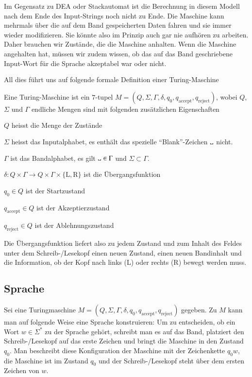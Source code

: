 Im Gegensatz zu DEA oder Stackautomat ist die Berechnung in diesem
Modell nach dem Ende des Input-Strings noch nicht zu Ende. Die Maschine
kann mehrmals über die auf dem Band gespeicherten Daten fahren und
sie immer wieder modifizieren. Sie könnte also im Prinzip auch
gar nie aufhören zu arbeiten. Daher brauchen wir Zustände, die
die Maschine anhalten. Wenn die Maschine angehalten hat, müssen wir
zudem wissen, ob das auf das Band geschriebene Input-Wort für die
Sprache akzeptabel war oder nicht.

All dies führt uns auf folgende formale Definition einer Turing-Maschine
\begin{definition}
%
Eine Turing-Maschine ist ein $7$-tupel
$M=(Q,\Sigma,\Gamma,\delta,q_0,q_{\text{accept}},q_{\text{reject}})$,
wobei $Q$, $\Sigma$ und $\Gamma$ endliche Mengen sind mit folgenden
zusätzlichen Eigenschaften
\begin{compactenum}
%
\item $Q$ heisst die Menge der Zustände
%
%
%
%
\item $\Sigma$ heisst das Inputalphabet, es enthält das spezielle
``Blank''-Zeichen $\blank$ nicht.
%
\item $\Gamma$ ist das Bandalphabet, es gilt $\blank\in\Gamma$ und
$\Sigma\subset\Gamma$.
%
\item $\delta\colon Q\times \Gamma\to Q\times\Gamma\times\{\text{L},\text{R}\}$
ist die Übergangsfunktion
%
\item $q_0\in Q$ ist der Startzustand
%
\item $q_{\text{accept}}\in Q$ ist der Akzeptierzustand
%
\item $q_{\text{reject}}\in Q$ ist der Ablehnungszustand
\end{compactenum}
\end{definition}
Die Übergangsfunktion liefert also zu jedem Zustand und zum
Inhalt des Feldes unter dem Schreib-/Lesekopf einen neuen
Zustand, einen neuen Bandinhalt und die Information, ob
der Kopf nach links (L) oder rechts (R) bewegt werden muss.

\subsection{Sprache}
Sei eine Turingmaschine
$M=(Q,\Sigma,\Gamma,\delta,q_0,q_{\text{accept}},q_{\text{reject}})$
gegeben.
Zu $M$ kann man auf folgende Weise eine Sprache konstruieren:
Um zu entscheiden, ob ein Wort $w\in\Sigma^*$
zu der Sprache gehört,
schreibt man es auf das Band, platziert den Schreib-/Lesekopf auf
das erste Zeichen und bringt die Maschine in den Zustand $q_0$.
%
Man beschreibt diese Konfiguration der Maschine mit der Zeichenkette
$q_0w$, die Maschine ist im Zustand $q_0$ und der Schreib-/Lesekopf
steht über dem ersten Zeichen von $w$.

